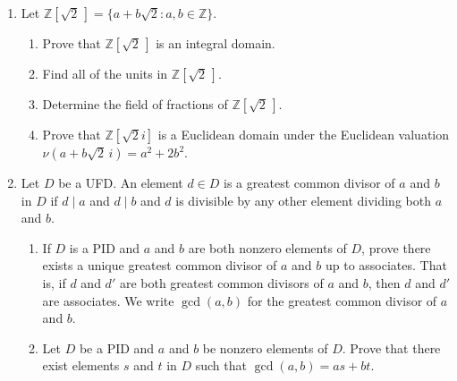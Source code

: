 {\begin{enumerate}
\begin{enumerate}
\end{enumerate}

 





 
 
 
\item
Let ${\mathbb Z}[ \sqrt{2}\, ] = \{ a + b \sqrt{2} : a, b \in {\mathbb Z} \}$. 
\begin{enumerate}

 \item
Prove that ${\mathbb Z}[ \sqrt{2}\, ]$ is an integral domain. 

 \item
Find all of the units in ${\mathbb Z}[\sqrt{2}\, ]$. 

 \item
Determine the field of fractions of ${\mathbb Z}[ \sqrt{2}\, ]$. 
 
 \item
Prove that  ${\mathbb Z}[ \sqrt{2} i ]$ is a Euclidean domain under the
Euclidean valuation $\nu( a + b \sqrt{2}\, i) = a^2 + 2b^2$. 
 
\end{enumerate}


\item
Let $D$ be a UFD. An element $d \in D$ is a {\bfi greatest common
divisor of} $a$
{\bfi and} $b$ {\bfi in} $D$ if $d \mid a$ and $d \mid b$ and $d$ is
divisible by any other element dividing both $a$ and $b$.  
\begin{enumerate}

 \item
If $D$ is a PID and $a$ and $b$ are both nonzero elements of $D$,
prove there exists a unique greatest common divisor of $a$ and $b$ up to associates. That is, if $d$ and $d'$ are both greatest common divisors of $a$ and $b$, then $d$ and $d'$ are associates.  We write $\gcd( a, b)$ for the greatest common divisor of $a$ and $b$. 


 \item
Let $D$ be a PID and $a$ and $b$ be nonzero elements of $D$. Prove
that there exist elements $s$ and $t$ in $D$ such that $\gcd(a, b) =
as + bt$.

\end{enumerate}



\end{enumerate}}

